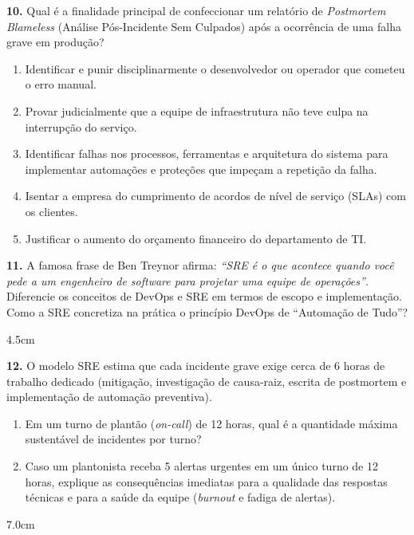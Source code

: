 \documentclass[12pt]{article}
\begin{document}
\textbf{10.} Qual é a finalidade principal de confeccionar um relatório de \textit{Postmortem Blameless} (Análise Pós-Incidente Sem Culpados) após a ocorrência de uma falha grave em produção?
\begin{enumerate}[label=\alph*)]
    \item Identificar e punir disciplinarmente o desenvolvedor ou operador que cometeu o erro manual.
    \item Provar judicialmente que a equipe de infraestrutura não teve culpa na interrupção do serviço.
    \item Identificar falhas nos processos, ferramentas e arquitetura do sistema para implementar automações e proteções que impeçam a repetição da falha.
    \item Isentar a empresa do cumprimento de acordos de nível de serviço (SLAs) com os clientes.
    \item Justificar o aumento do orçamento financeiro do departamento de TI.
\end{enumerate}

\vspace{0.4cm}

\textbf{11.} A famosa frase de Ben Treynor afirma: \textit{``SRE é o que acontece quando você pede a um engenheiro de software para projetar uma equipe de operações''}. Diferencie os conceitos de DevOps e SRE em termos de escopo e implementação. Como a SRE concretiza na prática o princípio DevOps de ``Automação de Tudo''?
\begin{resposta}{4.5cm}
\end{resposta}

\vspace{0.4cm}

\textbf{12.} O modelo SRE estima que cada incidente grave exige cerca de 6 horas de trabalho dedicado (mitigação, investigação de causa-raiz, escrita de postmortem e implementação de automação preventiva).
\begin{enumerate}[label=\alph*)]
    \item Em um turno de plantão (\textit{on-call}) de 12 horas, qual é a quantidade máxima sustentável de incidentes por turno?
    \item Caso um plantonista receba 5 alertas urgentes em um único turno de 12 horas, explique as consequências imediatas para a qualidade das respostas técnicas e para a saúde da equipe (\textit{burnout} e fadiga de alertas).
\end{enumerate}
\begin{resposta}{7.0cm}
\end{resposta}
\end{document}
